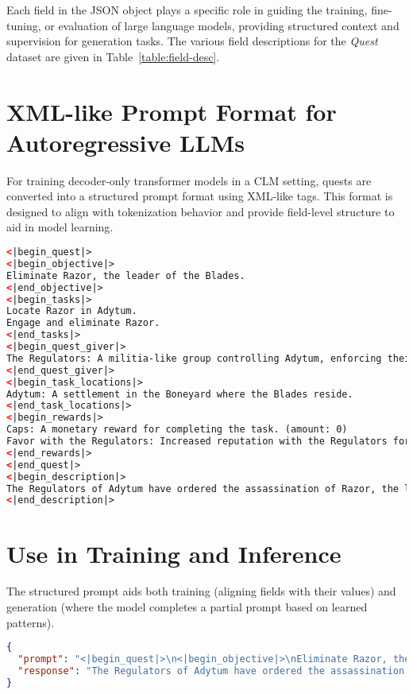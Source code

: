 Each field in the JSON object plays a specific role in guiding the training, fine-tuning,
or evaluation of large language models, providing structured context and supervision for
generation tasks. The various field descriptions for the \textit{Quest} dataset are given in
Table~\ref{table:field-desc}.

\section*{XML-like Prompt Format for Autoregressive LLMs}

For training decoder-only transformer models in a CLM setting, quests are converted into
a structured prompt format using XML-like tags. This format is designed to align with
tokenization behavior and provide field-level structure to aid in model learning.

\begin{lstlisting}[language=xml, caption={Sample Quest Dataset Format (XML-like)}]
<|begin_quest|>
<|begin_objective|>
Eliminate Razor, the leader of the Blades.
<|end_objective|>
<|begin_tasks|>
Locate Razor in Adytum.
Engage and eliminate Razor.
<|end_tasks|>
<|begin_quest_giver|>
The Regulators: A militia-like group controlling Adytum, enforcing their own brand of order.
<|end_quest_giver|>
<|begin_task_locations|>
Adytum: A settlement in the Boneyard where the Blades reside.
<|end_task_locations|>
<|begin_rewards|>
Caps: A monetary reward for completing the task. (amount: 0)
Favor with the Regulators: Increased reputation with the Regulators for carrying out their orders. (amount: NONE)
<|end_rewards|>
<|end_quest|>
<|begin_description|>
The Regulators of Adytum have ordered the assassination of Razor, the leader of the Blades. You must locate and kill her.
<|end_description|>
\end{lstlisting}

\section*{Use in Training and Inference}

The structured prompt aids both training (aligning fields with their values) and generation
(where the model completes a partial prompt based on learned patterns).

\begin{lstlisting}[language=json, caption={Sample Prompt-Response Input Format (JSON)}]
{
  "prompt": "<|begin_quest|>\n<|begin_objective|>\nEliminate Razor, the leader of the Blades.\n<|end_objective|>\n<|begin_tasks|>\nLocate Razor in Adytum.\nEngage and eliminate Razor.\n<|end_tasks|>\n<|begin_quest_giver|>\nThe Regulators: A militia-like group controlling Adytum, enforcing their own brand of order.\n<|end_quest_giver|>\n<|begin_task_locations|>\nAdytum: A settlement in the Boneyard where the Blades reside.\n<|end_task_locations|>\n<|begin_rewards|>\nCaps: A monetary reward for completing the task. (amount: 0)\nFavor with the Regulators: Increased reputation with the Regulators for carrying out their orders. (amount: NONE)\n<|end_rewards|>\n<|end_quest|>\n",
  "response": "The Regulators of Adytum have ordered the assassination of Razor, the leader of the Blades. You must locate and kill her."
}
\end{lstlisting}
